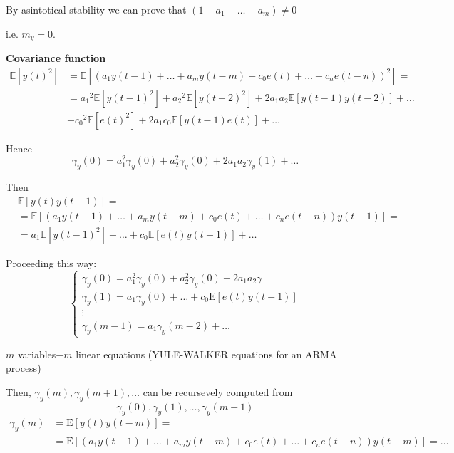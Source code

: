 By asintotical stability we can prove that $(1-a_1-\ldots-a_m)\neq0$

i.e. $m_{y}=0$.

\textbf{Covariance function}
\begin{align*}
	\mathbb{E}\left[y(t)^{2}\right]&=\mathbb{E}\left[\left(a_{1} y(t-1)+\ldots+a_{m} y(t-m)+c_{0} e(t)+\ldots+c_{n} e(t-n)\right)^{2}\right]=\\
	&= a_{1}{ }^{2} \mathbb{E}\left[y(t-1)^{2}\right]+a_{2}{ }^{2} \mathbb{E}\left[y(t-2)^{2}\right]+2 a_{1} a_{2} \mathbb{E}[y(t-1) y(t-2)]+\ldots \\
	&+c_{0}{ }^{2} \mathbb{E}\left[e(t)^{2}\right]+2 a_{1} c_{0} \mathbb{E}[y(t-1) e(t)]+\ldots
\end{align*}

Hence
$$
\gamma_{y}(0)=a_{1}^{2} \gamma_{y}(0)+a_{2}^{2} \gamma_{y}(0)+2 a_{1} a_{2} \gamma_{y}(1)+\ldots
$$

Then
\begin{align*}
	&\mathbb{E}[y(t) y(t-1)]= \\
	&=\mathbb{E}\left[\left(a_{1} y(t-1)+\ldots+a_{m} y(t-m)+c_{0} e(t)+\ldots+c_{n} e(t-n)\right) y(t-1)\right]= \\
	&=a_{1} \mathbb{E}\left[y(t-1)^{2}\right]+\ldots+c_{0} \mathbb{E}[e(t) y(t-1)]+\ldots
\end{align*}

Proceeding this way:
$$
\left\{\begin{array}{l}
	\gamma_{y}(0)=a_{1}^{2} \gamma_{y}(0)+a_{2}^{2} \gamma_{y}(0)+2 a_{1} a_{2} \gamma \\
	\gamma_{y}(1)=a_{1} \gamma_{y}(0)+\ldots+c_{0} \mathrm{E}[e(t) y(t-1)] \\
	\vdots \\
	\gamma_{y}(m-1)=a_{1} \gamma_{y}(m-2)+\ldots
\end{array}\right.
$$

$m$ variables$-m$ linear equations (YULE-WALKER equations for an ARMA process)

Then, $\gamma_{y}(m), \gamma_{y}(m+1), \ldots$ can be recursevely computed from
$$
\gamma_{y}(0), \gamma_{y}(1), \ldots, \gamma_{y}(m-1)
$$
\begin{align*}
	\gamma_{y}(m)&=\mathrm{E}[y(t) y(t-m)]= \\
	&=\mathrm{E}\left[\left(a_{1} y(t-1)+\ldots+a_{m} y(t-m)+c_{0} e(t)+\ldots+c_{n} e(t-n)\right) y(t-m)\right]=\ldots
\end{align*}

